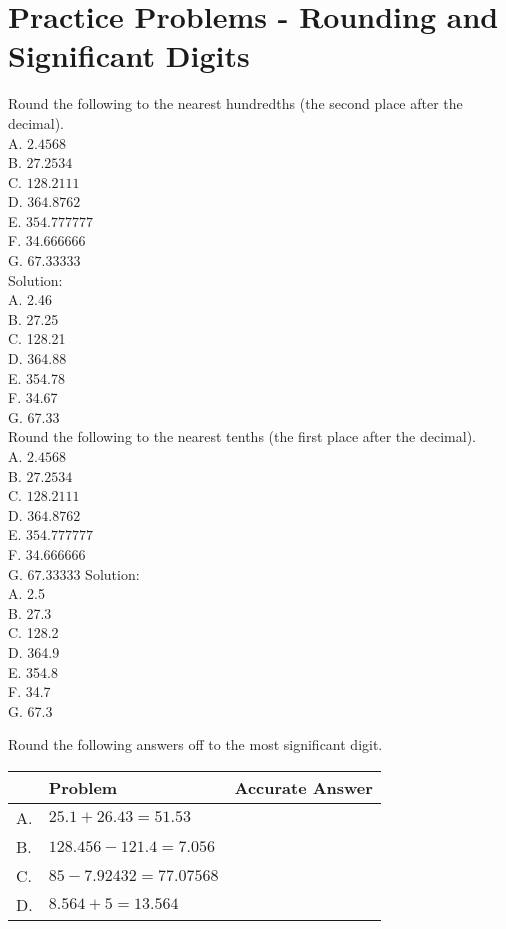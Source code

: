 \section*{Practice Problems - Rounding and Significant Digits}
Round the following to the nearest hundredths (the second place after the decimal).\\
A. $2.4568$\\
B. $27.2534$\\
C. $128.2111$\\
D. $364.8762$\\
E. $354.777777$\\
F. $34.666666$\\
G. $67.33333$\\
\vspace{0.5cm}
Solution:\\
A. 2.46\\
B. 27.25\\
C. 128.21\\
D. 364.88\\
E. 354.78\\
F. 34.67\\
G. 67.33\\
Round the following to the nearest tenths (the first place after the decimal).\\
A. $2.4568$\\
B. $27.2534$\\
C. $128.2111$\\
D. $364.8762$\\
E. $354.777777$\\
F. $34.666666$\\
G. $67.33333$
Solution:\\
A. 2.5\\
B. 27.3\\
C. 128.2\\
D. 364.9\\
E. 354.8\\
F. 34.7\\
G. 67.3

\vspace{0.5cm}

Round the following answers off to the most significant digit.\\

\begin{tabular}{|l|l|l|}
\hline
 & Problem & Accurate Answer \\
\hline
A. & $25.1+26.43=51.53$ &  \\
\hline
B. & $128.456-121.4=7.056$ &  \\
\hline
C. & $85-7.92432=77.07568$ &  \\
\hline
D. & $8.564+5=13.564$ &  \\
\hline
\end{tabular}

